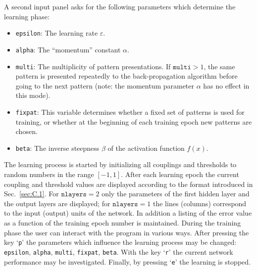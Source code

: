 A second input panel asks for the following parameters which determine the learning phase:
\begin{itemize}
\item \texttt{epsilon}: The learning rate $\varepsilon$.
\item \texttt{alpha}: The ``momentum'' constant $\alpha$.
\item \texttt{multi}: The multiplicity of pattern presentations. If $\texttt{multi}>1$, the same pattern is presented repeatedly to the back-propagation algorithm before going to the next pattern (note: the momentum parameter $\alpha$ has no effect in this mode).
\item \texttt{fixpat}: This variable determines whether a fixed set of patterns is used for training, or whether at the beginning of each training epoch new patterns are chosen.
\item \texttt{beta}: The inverse steepness $\beta$ of the activation function $f(x)$.
\end{itemize}

The learning process is started by initializing all couplings and thresholds to random numbers in the range $[-1,1]$. After each learning epoch the current coupling and threshold values are displayed according to the format introduced in Sec.~\ref{sec:C.1}. For $\texttt{nlayers}=2$ only the parameters of the first hidden layer and the output layers are displayed; for $\texttt{nlayers}=1$ the lines (columns) correspond to the input (output) units of the network. In addition a listing of the error value as a function of the training epoch number is maintained. During the training phase the user can interact with the program in various ways. After pressing the key `\texttt{p}' the parameters which influence the learning process may be changed: \texttt{epsilon}, \texttt{alpha}, \texttt{multi}, \texttt{fixpat}, \texttt{beta}. With the key `\texttt{r}' the current network performance may be investigated. Finally, by pressing `\texttt{e}' the learning is stopped.

